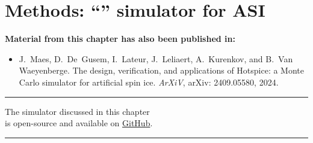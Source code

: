 \chapter{Methods: ``\hotspice'' simulator for ASI}\label{ch:Hotspice}
\begin{adjustwidth}{2em}{2em} %
    \begin{center}
        \textbf{Material from this chapter has also been published in:} \\
    \end{center}
    \vspace{1em}
    \begin{adjustwidth}{0em}{1.5em}
	    \begin{itemize}
	    	\item[\cite{MAES-24}] J.~Maes, D.~De~Gusem, I.~Lateur, J.~Leliaert, A.~Kurenkov, and B.~Van Waeyenberge.
	    	\newblock The design, verification, and applications of Hotspice: a Monte Carlo simulator for artificial spin ice.
	    	\newblock \emph{ArXiV}, arXiv: 2409.05580, 2024.
	    \end{itemize}
    \end{adjustwidth}
    \vspace{.5em}
    \begin{center}
        \centering\rule{0.7\linewidth}{0.4pt}
    \end{center}
    \vspace{.0em}
    \begin{center}
    	The \hotspice simulator discussed in this chapter\\
    	is open-source and available on \href{https://github.com/bvwaeyen/Hotspice}{GitHub}.
    \end{center}
    \begin{center}
    \centering\rule{0.7\linewidth}{0.4pt}
    \end{center}
    \vspace{1em}
\end{adjustwidth}

